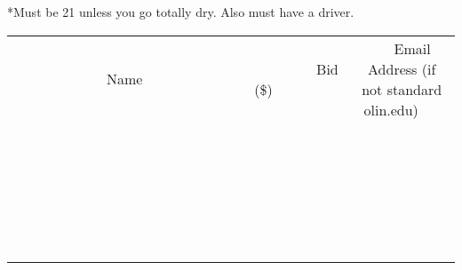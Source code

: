 \documentclass[11pt]{article}
\begin{document}
*Must be 21 unless you go totally dry. Also must have a driver.
\\[6ex]
\begin{tabular}{c c c}
~~~~~~~~~~~~~Name~~~~~~~~~~~~~ & ~~~~~~~~~Bid (\$)~~~~~~~~~  & ~~~Email Address (if not standard olin.edu)~~~\\
 & & \\
\hline
 & & \\
\hline
 & & \\
\hline
 & & \\
\hline
 & & \\
\hline
 & & \\
\hline
 & & \\
\hline
 & & \\
\hline
 & & \\
\hline
 & & \\
\hline
 & & \\
\hline
 & & \\
\hline
 & & \\
\hline
 & & \\
\hline
 & & \\
\hline
 & & \\
\hline
 & & \\
\hline
 & & \\
\hline
 & & \\
\hline
 & & \\
\hline
 & & \\
\hline
 & & \\
\hline
 & & \\
\hline
 & & \\
\hline
 & & \\
\hline
 & & \\
\hline
\end{tabular}
\newpage
\end{document}
